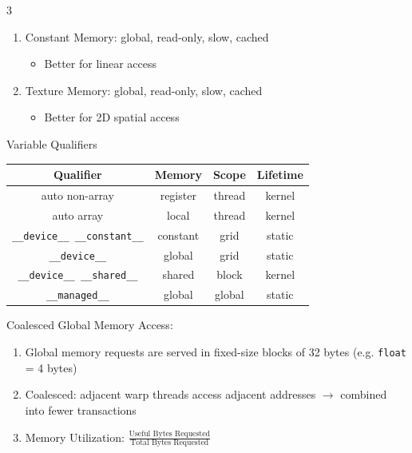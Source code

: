 \documentclass[12pt, a4paper]{article}
\begin{document}
\begin{multicols*}{3}
\begin{enumerate}[\roman*.]
\begin{itemize}[leftmargin=*]
      \item Usage: \lstinline|cudaMalloc|, \lstinline|cudaMemcpy|, \lstinline|cudaFree|
    \end{itemize}
  \item Constant Memory: global, read-only, slow, cached
    \begin{itemize}[leftmargin=*]\vspace{3pt}
      \item Better for linear access 
    \end{itemize}
  \item Texture Memory: global, read-only, slow, cached
    \begin{itemize}[leftmargin=*]\vspace{3pt}
      \item Better for 2D spatial access 
    \end{itemize}
\end{enumerate}
\vspace{-1em}
\begin{center}
\end{center}

\begin{center}
Variable Qualifiers
\begin{tabular}{|c|c|c|c|}
\hline
\textbf{Qualifier} & \textbf{Memory} & \textbf{Scope} & \textbf{Lifetime} \\
\hline
auto non-array & register  & thread & kernel \\
\hline
auto array & local  & thread & kernel \\
\hline
\lstinline|__device__ __constant__| & constant & grid  & static \\
\hline
\lstinline|__device__|   & global & grid  & static \\
\hline
\lstinline|__device__ __shared__|   & shared  & block & kernel \\
\hline
\lstinline|__managed__|  & global  & global & static \\
\hline
\end{tabular}
\end{center}
\vspace{-1em}
\colbreak

Coalesced Global Memory Access:
\begin{enumerate}[\roman*.]
  \item Global memory requests are served in fixed-size blocks of 32 bytes (e.g. \lstinline|float| = 4 bytes)
  \item Coalesced: adjacent warp threads access adjacent addresses $\rightarrow$ combined into fewer transactions
  \item Memory Utilization: $\frac{\text{Useful Bytes Requested}}{\text{Total Bytes Requested}}$
\end{enumerate}


\end{multicols*}
\end{document}
